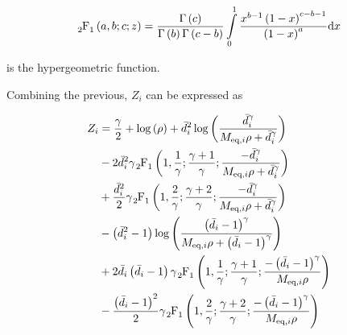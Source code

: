 \begin{equation} \label{eq:hypergeometric}
    \hgeo\left(a,b;c;z\right) = \frac{\Gamma\left(c\right)}{\Gamma\left(b\right)
    \Gamma\left(c - b\right)}\int\limits_0^1\frac{x^{b-1}\left(1-x\right)^
    {c-b-1}}{\left(1-x\right)^a}\dee x
\end{equation}

\noindent
is the hypergeometric function.

Combining the previous, $Z_i$ can be expressed as

\begin{equation} \label{eq:zi_appendix}
\begin{aligned}
    Z_i &= \frac{\gamma}{2} + \log\left(\rho\right) + \bar{d}_i^2\log\left(
    \frac{\bar{d}_i^{\gamma}}{\Meqi \rho + \bar{d}_i^{\gamma}}\right)\\
    &- 2 \bar{d}_i^2\gamma \hgeo \left(1,\frac{1}{\gamma};
    \frac{\gamma+1}{\gamma};\frac{-\bar{d}_i^{\gamma}}{\Meqi\rho +
    \bar{d}_i^{\gamma}}\right)\\
    &+ \frac{\bar{d}_i^2}{2}\gamma \hgeo\left(1, \frac{2}{\gamma};
    \frac{\gamma+2}{\gamma};\frac{-\bar{d}_i^{\gamma}}{\Meqi\rho +
    \bar{d}_i^{\gamma}}\right)\\
    &- \left(\bar{d}_i^2-1\right)\log\left(
    \frac{\left(\bar{d}_i-1\right)^{\gamma}}
    {\Meqi\rho+\left(\bar{d}_i - 1\right)^{\gamma}}\right)\\
    &+ 2\bar{d}_i\left(\bar{d}_i - 1\right)\gamma\hgeo\left(1,\frac{1}{\gamma};
    \frac{\gamma + 1}{\gamma};\frac{-\left(\bar{d}_i-1\right)^{\gamma}}
    {\Meqi\rho}\right)\\
    &- \frac{\left(\bar{d}_i-1\right)^2}{2}\gamma\hgeo\left(1,\frac{2}{\gamma};
    \frac{\gamma + 2}{\gamma};\frac{-\left(\bar{d}_i-1\right)^{\gamma}}
    {\Meqi\rho}\right)
\end{aligned}
\end{equation}


